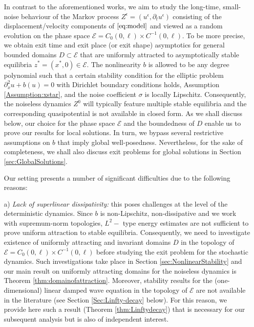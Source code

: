 \documentclass[10pt, reqno]{amsart}
\newcommand{\e}{\mathcal{E}}
\theoremstyle{definition}
\numberwithin{lem}{section}
\numberwithin{cor}{section}
\numberwithin{prop}{section}
\numberwithin{thm}{section}
\numberwithin{dfn}{section}
\begin{document}
   In contrast to the aforementioned works, we aim to study the long-time, small-noise behaviour of the Markov process $Z^\epsilon=(u^\epsilon, \partial_tu^\epsilon)$ consisting of the displacement/velocity components of $\eqref{eq:model}$ and viewed as a random evolution on the phase space $\e=C_0(0,\ell)\times C^{-1}(0,\ell).$ To be more precise, we obtain exit time and exit place (or exit shape) asymptotics for general bounded domains $D\subset\e$ that are uniformly attracted to asymptotically stable equilibria $z^*=(x^*, 0)\in\e.$ %
   The nonlinearity $b$ is allowed to be any degree polynomial such that a certain stability condition for the elliptic problem $\partial^{2}_{x}u+b(u)=0$ with Dirichlet boundary conditions holds, Assumption \ref{Assumption:xstar}, and the noise coefficient $\sigma$ is locally Lipschitz.
   Consequently, the noiseless dynamics $Z^0$ will typically feature multiple stable equilibria and the corresponding quasipotential is not available in closed form. 
   As we shall discuss below, our choice for the phase space $\e$ and the boundedness of $D$ enable us to prove our results for local solutions. In turn, we bypass several restrictive assumptions on $b$ that imply global well-posedness. Nevertheless, for the sake of completeness, we shall also discuss exit problems for global solutions in Section \ref{sec:GlobalSolutions}.

   
 
   
   Our setting presents a number of significant difficulties due to the following reasons:
   
   a) \textit{Lack of superlinear dissipativity:} this poses challenges at the level of the deterministic dynamics. Since $b$ is non-Lipschitz, non-dissipative and we work with supremum-norm topologies, $L^2-$ type energy estimates are not sufficient to prove uniform attraction to stable equilibria. Consequently, we need to investigate existence of uniformly attracting and invariant domains $D$ in the topology of $\e=C_0(0,\ell)\times C^{-1}(0,\ell)$ before studying the exit problem for the stochastic dynamics. Such investigations take place in Section \ref{sec:NonlinearStability} and our main result on uniformly attracting domains for the noiseless dynamics is Theorem \ref{thm:domainofattraction}. Moreover, stability results for the (one-dimensional) linear damped wave equation in the topology of $\e$ are not available in the literature (see Section \ref{Sec:Linfty-decay} below). For this reason, we provide here such a result (Theorem \ref{thm:Linftydecay}) that is necessary for our subsequent analysis but is also of independent interest.
   
\end{document}
